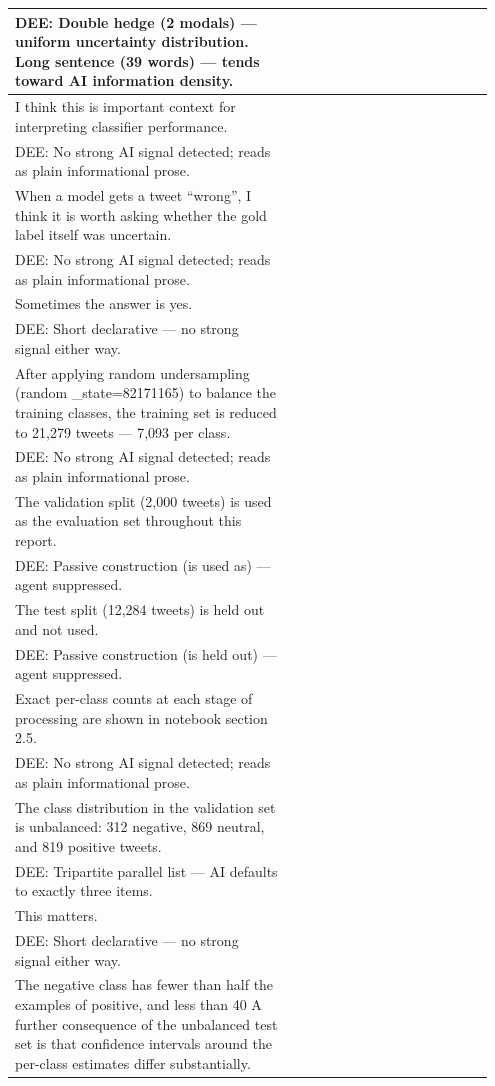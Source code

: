 \documentclass[11pt]{article}
\begin{document}
\begin{longtable}{|p{0.55\linewidth}|p{0.40\linewidth}|}
\hline
DEE: Double hedge (2 modals) --- uniform uncertainty distribution. Long sentence (39 words) --- tends toward AI information density. & \\
\hline
I think this is important context for interpreting classifier performance. & \\[2pt]
\hline
DEE: No strong AI signal detected; reads as plain informational prose. & \\
\hline
When a model gets a tweet ``wrong'', I think it is worth asking whether the gold label itself was uncertain. & \\[2pt]
\hline
DEE: No strong AI signal detected; reads as plain informational prose. & \\
\hline
Sometimes the answer is yes. & \\[2pt]
\hline
DEE: Short declarative --- no strong signal either way. & \\
\hline
After applying random undersampling (random \_state=82171165) to balance the training classes, the training set is reduced to 21,279 tweets --- 7,093 per class. & \\[2pt]
\hline
DEE: No strong AI signal detected; reads as plain informational prose. & \\
\hline
The validation split (2,000 tweets) is used as the evaluation set throughout this report. & \\[2pt]
\hline
DEE: Passive construction (is used as) --- agent suppressed. & \\
\hline
The test split (12,284 tweets) is held out and not used. & \\[2pt]
\hline
DEE: Passive construction (is held out) --- agent suppressed. & \\
\hline
Exact per-class counts at each stage of processing are shown in notebook section 2.5. & \\[2pt]
\hline
DEE: No strong AI signal detected; reads as plain informational prose. & \\
\hline
The class distribution in the validation set is unbalanced: 312 negative, 869 neutral, and 819 positive tweets. & \\[2pt]
\hline
DEE: Tripartite parallel list --- AI defaults to exactly three items. & \\
\hline
This matters. & \\[2pt]
\hline
DEE: Short declarative --- no strong signal either way. & \\
\hline
The negative class has fewer than half the examples of positive, and less than 40 A further consequence of the unbalanced test set is that confidence intervals around the per-class estimates differ substantially. & \\[2pt]

\end{longtable}
\end{document}
